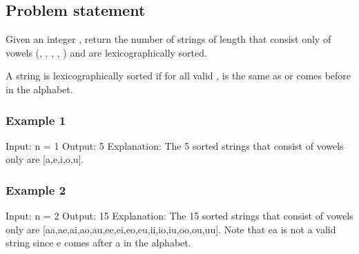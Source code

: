 \documentclass[letterpaper,12pt,english]{book}
\begin{document}
\subsection{Problem statement\sphinxfootnotemark[112]}
\label{\detokenize{Mathematics/09_MTH_1641_Count_Sorted_Vowel_Strings:problem-statement}}%
\begin{footnotetext}[112]\sphinxAtStartFootnote
{}
%
\end{footnotetext}\ignorespaces 
\sphinxAtStartPar
Given an integer , return the number of strings of length  that consist only of vowels (, , , , ) and are lexicographically sorted.

\sphinxAtStartPar
A string  is lexicographically sorted if for all valid ,  is the same as or comes before  in the alphabet.


\subsubsection{Example 1}
\label{\detokenize{Mathematics/09_MTH_1641_Count_Sorted_Vowel_Strings:example-1}}
\begin{sphinxVerbatim}[commandchars=\\\{\}]
Input: n = 1
Output: 5
Explanation: The 5 sorted strings that consist of vowels only are [\PYGZdq{}a\PYGZdq{},\PYGZdq{}e\PYGZdq{},\PYGZdq{}i\PYGZdq{},\PYGZdq{}o\PYGZdq{},\PYGZdq{}u\PYGZdq{}].
\end{sphinxVerbatim}


\subsubsection{Example 2}
\label{\detokenize{Mathematics/09_MTH_1641_Count_Sorted_Vowel_Strings:example-2}}
\begin{sphinxVerbatim}[commandchars=\\\{\}]
Input: n = 2
Output: 15
Explanation: The 15 sorted strings that consist of vowels only are
[\PYGZdq{}aa\PYGZdq{},\PYGZdq{}ae\PYGZdq{},\PYGZdq{}ai\PYGZdq{},\PYGZdq{}ao\PYGZdq{},\PYGZdq{}au\PYGZdq{},\PYGZdq{}ee\PYGZdq{},\PYGZdq{}ei\PYGZdq{},\PYGZdq{}eo\PYGZdq{},\PYGZdq{}eu\PYGZdq{},\PYGZdq{}ii\PYGZdq{},\PYGZdq{}io\PYGZdq{},\PYGZdq{}iu\PYGZdq{},\PYGZdq{}oo\PYGZdq{},\PYGZdq{}ou\PYGZdq{},\PYGZdq{}uu\PYGZdq{}].
Note that \PYGZdq{}ea\PYGZdq{} is not a valid string since \PYGZsq{}e\PYGZsq{} comes after \PYGZsq{}a\PYGZsq{} in the alphabet.
\end{sphinxVerbatim}
\end{document}
